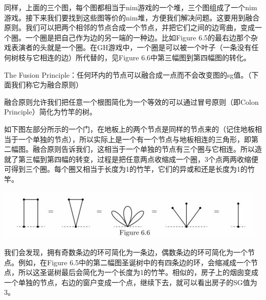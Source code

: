 	同样，上面的三个图，每个图都相当于nim游戏的一个堆，三个图组成了一个nim游戏。接下来我们要找到这些图等价的nim堆，方便我们解决问题。这要用到融合原则。我们可以把两个相邻的节点合成一个节点，并把它们之间的边弯曲，变成一个圈。一个圈是把自己作为边的另一端的一种边。比如Figure 6.5的最右边那个杂戏表演者的头就是一个圈。在GH游戏中，一个圈是可以被一个叶子（一条没有任何树枝与它相连的边）所代替的，见Figure 6.6中第三幅图到第四幅图的转化。
	
	The Fusion Principle：任何环内的节点可以融合成一点而不会改变图的sg值。（下面我们称它为融合原则）
	
	融合原则允许我们把任意一个根图简化为一个等效的可以通过冒号原则（即Colon Principle）简化为竹竿的树。
	
	如下图左部分所示的一个门，在地板上的两个节点是同样的节点来的（记住地板相当于一个单独的节点），所以实际上是一个有一个节点与地板相连的三角形，即第二幅图。融合原则告诉我们，这相当于一个单独的节点有三个圈与它相连。所以造就了第三幅到第四幅的转变，过程是把任意两点收缩成一个圈，3个点两两收缩便可得到三个圈。每个圈又相当于长度为1的竹竿，它们的异或和还是长度为1的竹竿。
	\begin{center}
		\includegraphics{./source/img10.jpg}
	\end{center}
	
	我们会发现，拥有奇数条边的环可简化为一条边，偶数条边的环可简化为一个节点。例如，在Figure 6.5中的第二幅图圣诞树中的有四条边的环，会缩减成一个节点，所以这圣诞树最后会简化为一个长度为1的竹竿。相似的，房子上的烟囱变成一个单独的节点，右边的窗户变成一个点，继续下去，就可以看出房子的SG值为3。
	
